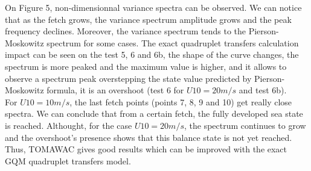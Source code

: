 \documentclass[10pt]{article}
\begin{document}
On Figure 5, non-dimensionnal variance spectra can be observed. We can notice that as the fetch grows, the variance spectrum amplitude grows and the peak frequency declines. Moreover, the variance spectrum tends to the Pierson-Moskowitz spectrum for some cases. The exact quadruplet transfers calculation impact can be seen on the test 5, 6 and 6b, the shape of the curve changes, the spectrum is more peaked and the maximum value is higher, and it allows to observe a spectrum peak overstepping the state value predicted by Pierson-Moskowitz formula, it is an overshoot (test 6 for $U10 = 20m/s$ and test 6b).\\
For $U10 = 10m/s$, the last fetch points (points 7, 8, 9 and 10) get really close spectra. We can conclude that from a certain fetch, the fully developed sea state is reached. Althought, for the case $U10 = 20m/s$, the spectrum continues to grow and the overshoot's presence shows that this balance state is not yet reached. Thus, TOMAWAC gives good results which can be improved with the exact GQM quadruplet transfers model.
\end{document}
